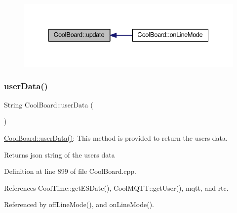 \nopagebreak
\begin{figure}[H]
\begin{center}
\leavevmode
\includegraphics[width=335pt]{classCoolBoard_a8612756d3f73198cdde857a66f0fe690_icgraph}
\end{center}
\end{figure}
\mbox{\label{classCoolBoard_ae7358fb6e623cfc81b775f5f1734909b}} 
\subsubsection{\texorpdfstring{user\+Data()}{userData()}}
{\footnotesize\ttfamily String Cool\+Board\+::user\+Data (\begin{DoxyParamCaption}{ }\end{DoxyParamCaption})}

\hyperlink{classCoolBoard_ae7358fb6e623cfc81b775f5f1734909b}{Cool\+Board\+::user\+Data()}\+: This method is provided to return the user\textquotesingle{}s data.

\begin{DoxyReturn}{Returns}
json string of the user\textquotesingle{}s data 
\end{DoxyReturn}


Definition at line 899 of file Cool\+Board.\+cpp.



References Cool\+Time\+::get\+E\+S\+Date(), Cool\+M\+Q\+T\+T\+::get\+User(), mqtt, and rtc.



Referenced by off\+Line\+Mode(), and on\+Line\+Mode().


